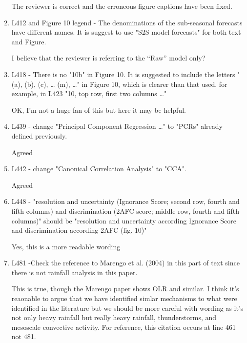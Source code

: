 \documentclass{article}
\newenvironment{answer}{\begin{mdframed}}{\end{mdframed}}
\begin{document}
\begin{enumerate}
	\begin{answer}
		The reviewer is correct and the erroneous figure captions have been fixed.
	\end{answer}
	\item L412 and Figure 10 legend - The denominations of the sub-seasonal forecasts have different names. It is suggest to use "S2S model forecasts" for both text and Figure.
	\begin{answer}
		I believe that the reviewer is referring to the ``Raw'' model only?
	\end{answer}
	\item L418 - There is no "10b" in Figure 10. It is suggested to include the letters "(a), (b), (c), … (m), …" in Figure 10, which is clearer than that used, for example, in L423 "10, top row, first two columns …"
	\begin{answer}
		OK, I'm not a huge fan of this but here it may be helpful.
	\end{answer}
	\item L439 - change "Principal Component Regression …" to "PCRs" already defined previously.
	\begin{answer}
		Agreed
	\end{answer}
	\item L442 - change "Canonical Correlation Analysis" to "CCA".
	\begin{answer}
		Agreed
	\end{answer}
	\item L448 - "resolution and uncertainty (Ignorance Score; second row, fourth and fifth columns) and discrimination (2AFC score; middle row, fourth and fifth columns)" should be "resolution and uncertainty according Ignorance Score and discrimination according 2AFC (fig. 10)"
	\begin{answer}
		Yes, this is a more readable wording
	\end{answer}
	\item L481 -Check the reference to Marengo et al. (2004) in this part of text since there is not rainfall analysis in this paper.
	\begin{answer}
		This is true, though the Marengo paper shows OLR and similar.
		I think it's reaonable to argue that we have identified simlar mechanisms to what were identified in the literature but we should be more careful with wording as it's not only heavy rainfall but really heavy rainfall, thunderstorms, and mesoscale convective activity.
		For reference, this citation occurs at line 461 not 481.
	\end{answer}

\end{enumerate}
\end{document}
